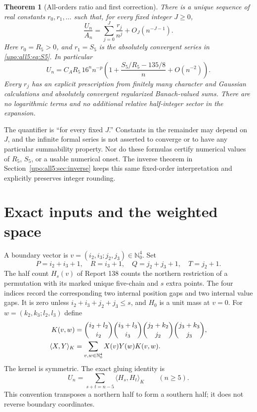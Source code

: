 \documentclass[11pt,letterpaper]{article}
\newtheorem{theorem}{Theorem}[section]
\theoremstyle{remark}\newtheorem{remark}[theorem]{Remark}
\numberwithin{equation}{section}
\newcommand{\NN}{\mathbb N_0}
\newcommand{\pair}[2]{\langle #1,#2\rangle_K}
\begin{document}
\begin{theorem}[All-orders ratio and first correction]\label{upo:all5:thm:main}
There is a unique sequence of real constants $r_0,r_1,\ldots$ such that,
for every fixed integer $J\ge0$,
\begin{equation}\label{upo:all5:eq:ratio-main}
 \frac{U_n}{A_n}=\sum_{j=0}^J\frac{r_j}{n^j}
                      +O_J(n^{-J-1}).
\end{equation}
Here $r_0=R_5>0$, and $r_1=S_5$ is the absolutely convergent series
in \eqref{upo:all5:eq:S5}. In particular
\begin{equation}\label{upo:all5:eq:first-main}
 U_n=C_A R_5\,16^n n^{-p}
 \left(1+\frac{S_5/R_5-135/8}{n}+O(n^{-2})\right).
\end{equation}
Every $r_j$ has an explicit prescription from finitely many character
and Gaussian calculations and absolutely convergent regularized
Banach-valued sums. There are no logarithmic terms and no additional
relative half-integer sector in the expansion.
\end{theorem}

The quantifier is ``for every fixed $J$.'' Constants in the remainder
may depend on $J$, and the infinite formal series is not asserted to
converge or to have any particular summability property. Nor do these
formulas certify numerical values of $R_5$, $S_5$, or a usable numerical
onset. The inverse theorem in Section~\ref{upo:all5:sec:inverse} keeps this same
fixed-order interpretation and explicitly preserves integer rounding.

\section{Exact inputs and the weighted space}\label{upo:all5:sec:inputs}
A boundary vector is $v=(i_2,i_3;j_2,j_3)\in\NN^4$. Set
\begin{equation}\label{upo:all5:eq:PQ}
 P=i_2+i_3+1,\quad R=i_3+1,\quad
 Q=j_2+j_3+1,\quad T=j_2+1.
\end{equation}
The half count $H_s(v)$ of Report 138 counts the northern restriction
of a permutation with its marked unique five-chain and $s$ extra
points. The four indices record the corresponding two internal
position gaps and two internal value gaps. It is zero unless
$i_2+i_3+j_2+j_3\le s$, and $H_0$ is a unit mass at $v=0$.
For $w=(k_2,k_3;l_2,l_3)$ define
\begin{align}\label{upo:all5:eq:kernel}
 K(v,w)&=\binom{i_2+l_2}{i_2}\binom{i_3+l_3}{i_3}
          \binom{j_2+k_2}{j_2}\binom{j_3+k_3}{j_3},\\
 \pair XY&=\sum_{v,w\in\NN^4}X(v)Y(w)K(v,w).\notag
\end{align}
The kernel is symmetric. The exact gluing identity is
\begin{equation}\label{upo:all5:eq:glue}
 U_n=\sum_{s+t=n-5}\pair{H_s}{H_t}\qquad(n\ge5).
\end{equation}
This convention transposes a northern half to form a southern half;
it does not reverse boundary coordinates.
\end{document}

